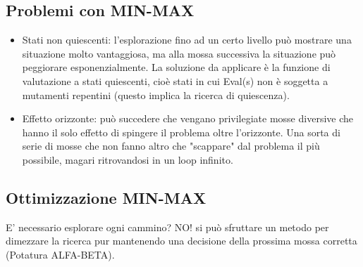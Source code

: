 \documentclass{article}
\begin{document}
\subsection{Problemi con MIN-MAX}
\begin{itemize}
    \item Stati non quiescenti: l’esplorazione fino ad un certo livello può mostrare una situazione molto vantaggiosa, ma alla mossa successiva la situazione può peggiorare esponenzialmente. La soluzione da applicare è la funzione di valutazione a stati quiescenti, cioè stati in cui Eval(s) non è soggetta a mutamenti repentini (questo implica la ricerca di quiescenza).
    \item Effetto orizzonte: può succedere che vengano privilegiate mosse diversive che hanno il solo effetto di spingere il problema oltre l’orizzonte. Una sorta di serie di mosse che non fanno altro che "scappare" dal problema il più possibile, magari ritrovandosi in un loop infinito.
\end{itemize}

\subsection{Ottimizzazione MIN-MAX}
E' necessario esplorare ogni cammino? NO! si può sfruttare un metodo per dimezzare la ricerca pur mantenendo una decisione della prossima mossa corretta (Potatura ALFA-BETA).
\end{document}
